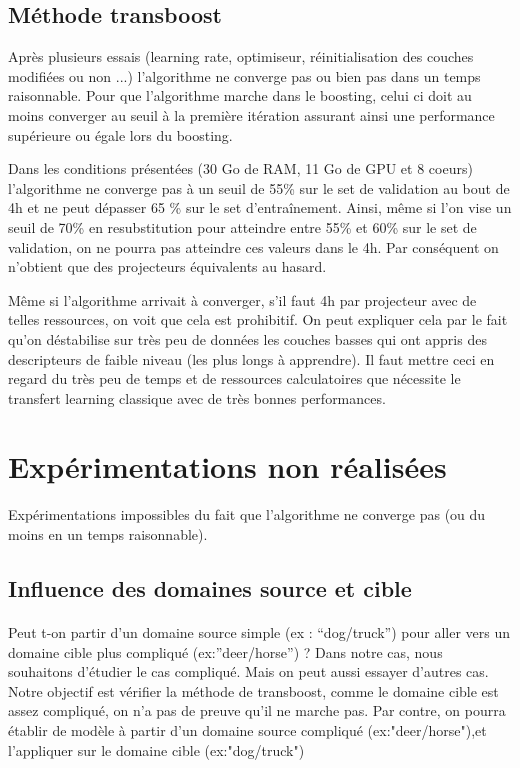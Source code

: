 \documentclass[11 pt]{article}
\begin{document}
\subsection{Méthode transboost}

Après plusieurs essais (learning rate, optimiseur, réinitialisation des couches modifiées ou non ...) l'algorithme ne converge pas ou bien pas dans un temps raisonnable. Pour que l'algorithme marche dans le boosting, celui ci doit au moins converger au seuil à la première itération assurant ainsi une performance supérieure ou égale lors du boosting.

\bigskip

Dans les conditions présentées (30 Go de RAM, 11 Go de GPU et 8 coeurs) l'algorithme ne converge pas à un seuil de 55\% sur le set de validation au bout de 4h et ne peut dépasser 65 \% sur le set d'entraînement. Ainsi, même si l'on vise un seuil de 70\% en resubstitution pour atteindre entre 55\% et 60\% sur le set de validation, on ne pourra pas atteindre ces valeurs dans le 4h. Par conséquent on n'obtient que des projecteurs équivalents au hasard.

\bigskip
Même si l'algorithme arrivait à converger, s'il faut 4h par projecteur avec de telles ressources, on voit que cela est prohibitif. On peut expliquer cela par le fait qu'on déstabilise sur très peu de données les couches basses qui ont appris des descripteurs de faible niveau (les plus longs à apprendre). Il faut mettre ceci en regard du très peu de temps et de ressources calculatoires que nécessite le transfert learning classique avec de très bonnes performances.

\section{Expérimentations non réalisées}
Expérimentations impossibles du fait que l'algorithme ne converge pas (ou du moins en un temps raisonnable).
\subsection{Influence des domaines source et cible}
\paragraph{}Peut t-on partir d’un domaine source simple (ex : “dog/truck”) pour aller vers un domaine cible plus compliqué (ex:”deer/horse”) ?
Dans notre cas, nous souhaitons d'étudier le cas compliqué. Mais on peut aussi essayer d'autres cas. Notre objectif est vérifier la méthode de transboost, comme le domaine cible est assez compliqué, on n'a pas de preuve qu'il ne marche pas. Par contre, on pourra établir de modèle à partir d'un domaine source compliqué (ex:"deer/horse"),et l'appliquer sur le domaine cible (ex:"dog/truck")
\end{document}
